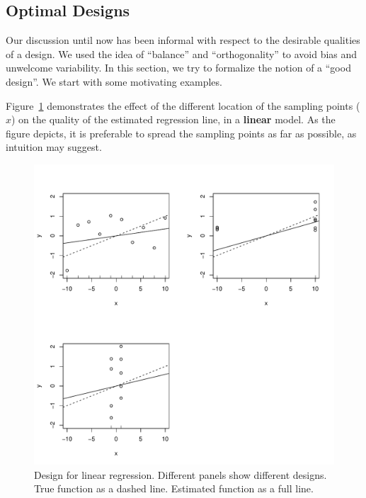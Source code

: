 \subsection{Optimal Designs}


Our discussion until now has been informal with respect to the desirable qualities of a design. 
We used the idea of ``balance'' and ``orthogonality'' to avoid bias and unwelcome variability.
In this section, we try to formalize the notion of a ``good design''.
We start with some motivating examples.

\begin{example}
\label{eg:design_linear}
Figure~\ref{fig:design_linear} demonstrates the effect of the different location of the sampling points ($x$) on the quality of the estimated regression line, in a \textbf{linear} model.
As the figure depicts, it is preferable to spread the sampling points as far as possible, as intuition may suggest.
\begin{figure}[ht]
\centering
\includegraphics[height=0.3\textheight]{art/linear}
\caption[Design for Linear Models]{Design for linear regression. Different panels show different designs. True function as a dashed line. Estimated function as a full line.}
\label{fig:design_linear}
\end{figure}
\end{example}





